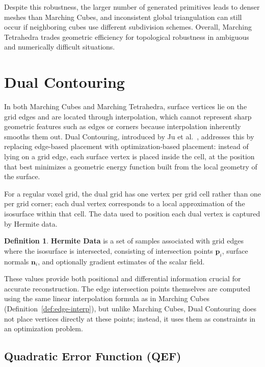 \documentclass[12pt, a4paper, oneside]{book}
\theoremstyle{plain}
\theoremstyle{definition}
\newtheorem{definition}[theorem]{Definition}
\theoremstyle{remark}
\theoremstyle{definition}
\begin{document}
Despite this robustness, the larger number of generated primitives leads to denser meshes than Marching Cubes, and inconsistent global triangulation can still occur if neighboring cubes use different subdivision schemes. Overall, Marching Tetrahedra trades geometric efficiency for topological robustness in ambiguous and numerically difficult situations.

\section{Dual Contouring}

In both Marching Cubes and Marching Tetrahedra, surface vertices lie on the grid edges and are located through interpolation, which cannot represent sharp geometric features such as edges or corners because interpolation inherently smooths them out. Dual Contouring, introduced by Ju et al.\ \cite{ju2002dual}, addresses this by replacing edge-based placement with optimization-based placement: instead of lying on a grid edge, each surface vertex is placed inside the cell, at the position that best minimizes a geometric energy function built from the local geometry of the surface.

For a regular voxel grid, the dual grid has one vertex per grid cell rather than one per grid corner; each dual vertex corresponds to a local approximation of the isosurface within that cell. The data used to position each dual vertex is captured by Hermite data.

\begin{definition}
    \textbf{Hermite Data} is a set of samples associated with grid edges where the isosurface is intersected, consisting of intersection points $\mathbf{p}_i$, surface normals $\mathbf{n}_i$, and optionally gradient estimates of the scalar field.
\end{definition}

These values provide both positional and differential information crucial for accurate reconstruction. The edge intersection points themselves are computed using the same linear interpolation formula as in Marching Cubes (Definition~\ref{def:edge-interp}), but unlike Marching Cubes, Dual Contouring does not place vertices directly at these points; instead, it uses them as constraints in an optimization problem.

\subsection{Quadratic Error Function (QEF)}
\end{document}
